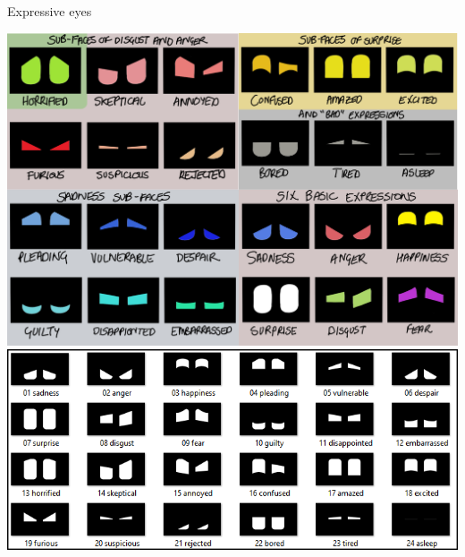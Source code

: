 \documentclass[xcolor=table]{beamer}
\begin{document}
\begin{frame}{Expressive eyes}
    \begin{center}
        \includegraphics[width=0.45\linewidth]{figs/expressive-eyes/expressive-eyes-chambers.png}
        \hspace{0.5em}
        \includegraphics[width=0.45\linewidth]{figs/expressive-eyes/generated_faces.png}
    \end{center}


\end{frame}
\end{document}
